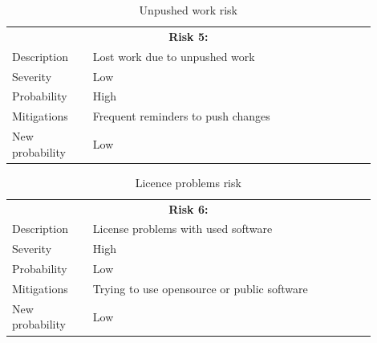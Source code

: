 \begin{table}
  \centering
  \begin{tabular}{|p{0.2\linewidth}p{0.7\linewidth}|}
    \hline
    \multicolumn{2}{|c|}{\textbf{Risk 5:}} \\
    Description     & Lost work due to unpushed work           \\
    Severity        & Low                                 \\
    Probability     & High                                   \\
    Mitigations     & Frequent reminders to push changes  \\
    New probability & Low   \\
    \hline                                
  \end{tabular}
  \caption{Unpushed work risk}
\end{table}

\begin{table}
  \centering
  \begin{tabular}{|p{0.2\linewidth}p{0.7\linewidth}|}
    \hline
    \multicolumn{2}{|c|}{\textbf{Risk 6:}} \\
    Description     & License problems with used software           \\
    Severity        & High                                 \\
    Probability     & Low                                   \\
    Mitigations     & Trying to use opensource or public software  \\
    New probability & Low       \\
    \hline                            
  \end{tabular}
  \caption{Licence problems risk}
\end{table}
